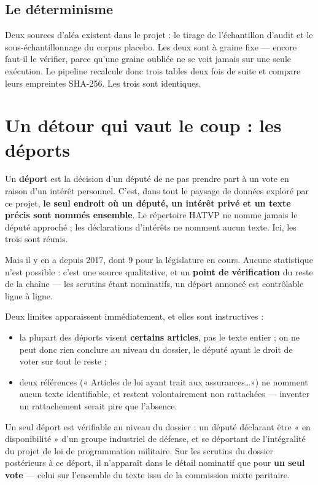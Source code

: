 \documentclass[11pt,a4paper]{article}
\begin{document}
\subsection{Le déterminisme}

Deux sources d'aléa existent dans le projet : le tirage de l'échantillon d'audit et le
sous-échantillonnage du corpus placebo. Les deux sont à graine fixe --- encore faut-il le
vérifier, parce qu'une graine oubliée ne se voit jamais sur une seule exécution. Le
pipeline recalcule donc trois tables deux fois de suite et compare leurs empreintes
SHA-256. Les trois sont identiques.

\newpage
\section{Un détour qui vaut le coup : les déports}

Un \textbf{déport} est la décision d'un député de ne pas prendre part à un vote en raison
d'un intérêt personnel. C'est, dans tout le paysage de données exploré par ce projet,
\textbf{le seul endroit où un député, un intérêt privé et un texte précis sont nommés
ensemble}. Le répertoire HATVP ne nomme jamais le député approché ; les déclarations
d'intérêts ne nomment aucun texte. Ici, les trois sont réunis.

Mais il y en a  depuis 2017, dont 9 pour la législature en cours. Aucune
statistique n'est possible : c'est une source qualitative, et un \textbf{point de
vérification} du reste de la chaîne --- les scrutins étant nominatifs, un déport annoncé
est contrôlable ligne à ligne.

Deux limites apparaissent immédiatement, et elles sont instructives :
\begin{itemize}
\item la plupart des déports visent \textbf{certains articles}, pas le texte entier ; on ne
  peut donc rien conclure au niveau du dossier, le député ayant le droit de voter sur tout
  le reste ;
\item deux références (« Articles de loi ayant trait aux assurances\ldots ») ne nomment
  aucun texte identifiable, et restent volontairement non rattachées --- inventer un
  rattachement serait pire que l'absence.
\end{itemize}

Un seul déport est vérifiable au niveau du dossier : un député déclarant être
« en disponibilité » d'un groupe industriel de défense, et se déportant de l'intégralité
du projet de loi de programmation militaire. Sur les  scrutins du dossier
postérieurs à ce déport, il n'apparaît dans le détail nominatif que pour
\textbf{un seul vote} --- celui sur l'ensemble du texte issu de la commission mixte
paritaire.
\end{document}
